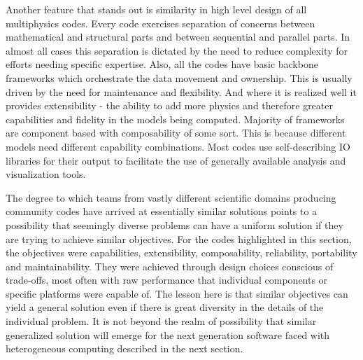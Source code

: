 Another feature that stands out is similarity in high level design of
all multiphysics codes. Every code exercises separation of concerns
between mathematical and structural parts and between sequential and
parallel parts. In almost all cases this separation is dictated by the
need to reduce complexity for efforts needing specific
expertise. Also, all the codes have basic backbone frameworks which
orchestrate the data movement and ownership. This is
usually driven by the need for maintenance and flexibility. And where
it is realized well it provides extensibility - the ability to add
more physics and therefore greater capabilities and fidelity in the
models being computed. Majority of frameworks are component based with
composability of some sort. This is because different models need
different capability combinations. Most codes use self-describing IO
libraries for their output to facilitate the use of generally
available analysis and visualization tools. 

The degree to which teams from vastly different scientific domains
producing community codes have arrived at essentially similar
solutions points to a possibility that seemingly
diverse problems can have a uniform solution if they are trying to
achieve similar objectives. For the codes highlighted in this section,
the objectives were capabilities, extensibility, composability,
reliability, portability and maintainability. They were achieved
through design choices conscious of trade-offs, most often with raw
performance that individual components or specific platforms were
capable of. The lesson here is that similar objectives can yield a
general solution even if there is great diversity in the details of
the individual problem. It is not beyond the realm of possibility that
similar generalized solution will emerge for the next generation
software faced with heterogeneous computing described in the next
section.
